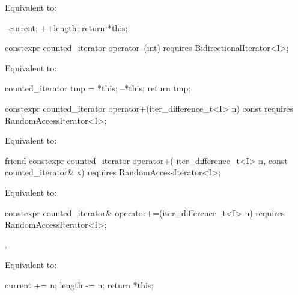 \begin{itemdescr}
\pnum
\effects Equivalent to:
\begin{codeblock}
--current;
++length;
return *this;
\end{codeblock}
\end{itemdescr}

%
\begin{itemdecl}
  constexpr counted_iterator operator--(int)
    requires BidirectionalIterator<I>;
\end{itemdecl}

\begin{itemdescr}
\pnum
\effects Equivalent to:
\begin{codeblock}
counted_iterator tmp = *this;
--*this;
return tmp;
\end{codeblock}
\end{itemdescr}

%
\begin{itemdecl}
  constexpr counted_iterator operator+(iter_difference_t<I> n) const
    requires RandomAccessIterator<I>;
\end{itemdecl}

\begin{itemdescr}
\pnum
\effects Equivalent to: 
\end{itemdescr}

%
\begin{itemdecl}
friend constexpr counted_iterator operator+(
  iter_difference_t<I> n, const counted_iterator& x)
    requires RandomAccessIterator<I>;
\end{itemdecl}

\begin{itemdescr}
\pnum
\effects Equivalent to: 
\end{itemdescr}

%
\begin{itemdecl}
  constexpr counted_iterator& operator+=(iter_difference_t<I> n)
    requires RandomAccessIterator<I>;
\end{itemdecl}

\begin{itemdescr}
\pnum
\expects {}.

\pnum
\effects Equivalent to:
\begin{codeblock}
current += n;
length -= n;
return *this;
\end{codeblock}
\end{itemdescr}

